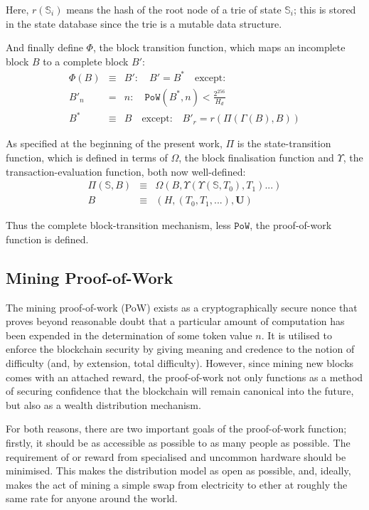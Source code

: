 \documentclass[9pt,oneside]{amsart}
\begin{document}
\begin{multicols}{2}
Here, $r(\mathbb{S}_i)$ means the hash of the root node of a trie of state $\mathbb{S}_i$; this is stored in the state database since the trie is a mutable data structure.

And finally define $\Phi$, the block transition function, which maps an incomplete block $B$ to a complete block $B'$:
\begin{eqnarray}
\Phi(B) & \equiv & B': \quad B' = B^* \quad \text{except:} \\
B'_n & = & n: \quad \mathtt{PoW}(B^*, n) < \frac{2^{256}}{H_d} \\
B^* & \equiv & B \quad \text{except:} \quad B'_r = r(\Pi(\Gamma(B), B))
\end{eqnarray}

As specified at the beginning of the present work, $\Pi$ is the state-transition function, which is defined in terms of $\Omega$, the block finalisation function and $\Upsilon$, the transaction-evaluation function, both now well-defined:
\begin{eqnarray}
\Pi(\mathbb{S}, B) & \equiv & \Omega(B, \Upsilon(\Upsilon(\mathbb{S}, T_0), T_1) ...) \\
B & \equiv & (H, (T_0, T_1, ...), \mathbf{U})
\end{eqnarray}

Thus the complete block-transition mechanism, less $\mathtt{PoW}$, the proof-of-work function is defined.

\subsection{Mining Proof-of-Work} \label{ch:pow}

The mining proof-of-work (PoW) exists as a cryptographically secure nonce that proves beyond reasonable doubt that a particular amount of computation has been expended in the determination of some token value $n$. It is utilised to enforce the blockchain security by giving meaning and credence to the notion of difficulty (and, by extension, total difficulty). However, since mining new blocks comes with an attached reward, the proof-of-work not only functions as a method of securing confidence that the blockchain will remain canonical into the future, but also as a wealth distribution mechanism.

For both reasons, there are two important goals of the proof-of-work function; firstly, it should be as accessible as possible to as many people as possible. The requirement of or reward from specialised and uncommon hardware should be minimised. This makes the distribution model as open as possible, and, ideally, makes the act of mining a simple swap from electricity to ether at roughly the same rate for anyone around the world.


\end{multicols}
\end{document}
